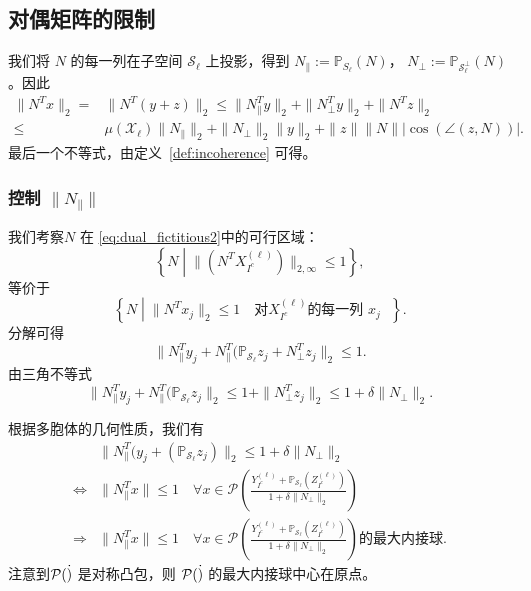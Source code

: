 \documentclass[main.tex]{subfiles}
\begin{document}
\subsection{对偶矩阵的限制}\label{sec:dual_separation}

我们将 $N$ 的每一列在子空间 $\mathcal{S}_{\ell}$ 上投影，得到 $N_{\parallel} :=\mathbb{P}_{S_\ell}(N)$，
$N_{\perp} := \mathbb{P}_{\mathcal{S}_{\ell}^\perp}(N)$。因此
\begin{align}\label{eq:showing_dual_sep_cond}
  \| N^T x \|_2 =& \| N^T (y+z)\|_2 \leq \| N_{\parallel}^T y\|_2+\|
  N_{\perp}^T y\|_2+\|N^T z\|_2\\
  \leq& \mu(\mathcal{X}_{\ell}) \|N_{\parallel}\|_2 + \|N_{\perp}\|_2\|y\|_2
  + \|z\|\|N\||\cos(\angle (z,N))|.
\end{align}
最后一个不等式，由定义~\ref{def:incoherence} 可得。

\subsubsection{控制 $\|N_{\parallel}\|$}
我们考察$N$ 在 \eqref{eq:dual_fictitious2}中的可行区域：
$$\left\{N \middle| \|(N^T X^{(\ell)}_{I^c})\|_{2,\infty} \leq 1\right\},$$
等价于
$$\left\{N \middle| \| N^T x_j\|_2 \leq 1 \quad\text{对$X^{(\ell)}_{I^c}$的每一列 $x_j$ }\right\}.$$
分解可得
$$\| N_{\parallel}^T y_j+N_{\parallel}^T (\mathbb{P}_{\mathcal{S}_{\ell}}z_j +
N_{\perp}^T z_j\|_2 \leq 1.$$
由三角不等式
\begin{equation}\label{eq:relax_constraint}
  \| N_{\parallel}^T y_j+N_{\parallel}^T (\mathbb{P}_{\mathcal{S}_{\ell}}z_j \|_2
  \leq 1+\|N_{\perp}^T z_j\|_2 \leq 1+\delta\|N_{\perp}\|_2.
\end{equation}

根据多胞体的几何性质，我们有
\begin{align}
  & \| N_{\parallel}^T (y_j+ (\mathbb{P}_{\mathcal{S}_{\ell}}z_j) \|_2 \leq
  1+\delta\|N_{\perp}\|_2 \nonumber\\
  \Leftrightarrow & \|N_{\parallel}^T x\| \leq 1 \quad \forall x \in \mathcal{P}\left(\frac{Y_{I^c}^{(\ell)}+
  \mathbb{P}_{\mathcal{S}_{\ell}}(Z_{I^c}^{(\ell)})}{1+\delta\|N_{\perp}\|_2}\right)
  \nonumber\\
  \Rightarrow & \|N_{\parallel}^T x\| \leq 1 \quad \forall x \in \mathcal{P}\left(\frac{Y_{I^c}^{(\ell)}+
  \mathbb{P}_{\mathcal{S}_{\ell}}(Z_{I^c}^{(\ell)})}{1+\delta\|N_{\perp}\|_2}\right)
  \text{的最大内接球}.\label{eq:Geometric_dual}
\end{align}
注意到$\mathcal{P}(\dot)$ 是对称凸包，则 $\mathcal{P}(\dot)$ 的最大内接球中心在原点。
\end{document}
